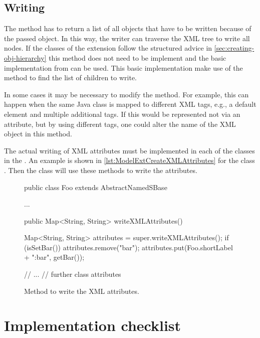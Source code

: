 \subsection{Writing}

The method   has to return a list of all
objects that have to be written because of the passed object.  In this way,
the writer can traverse the XML tree to write all nodes. If the classes of the
extension follow the structured advice in \vref{sec:creating-obj-hierarchy} this
method does not need to be implement and the basic implementation from 
can be used. This basic implementation make use of the  method
to find the list of children to write.

In some cases it may be necessary to modify the 
method.  For example, this can happen when the same Java class is mapped to
different XML tags, e.g., a default element and multiple additional tags.
If this would be represented not via an attribute, but by using different
tags, one could alter the name of the XML object in this method.

The actual writing of XML attributes must be implemented in each of the
classes in the .  An example is shown in 
\vref{lst:ModelExtCreateXMLAttributes} for the class .
Then the  class will use these methods to write
the attributes.

\begin{figure}[htb]
  \begin{example}[numbers=left]
public class Foo extends AbstractNamedSBase {
  ...

  public Map<String, String> writeXMLAttributes() {
    Map<String, String> attributes = super.writeXMLAttributes();
    if (isSetBar()) {
      attributes.remove("bar");
      attributes.put(Foo.shortLabel + ":bar", getBar());
    }

    // ...
    // further class attributes
  }
}\end{example}
  \caption{Method to write the XML attributes.}
  \label{lst:ModelExtCreateXMLAttributes}
\end{figure}




\section{Implementation checklist}

